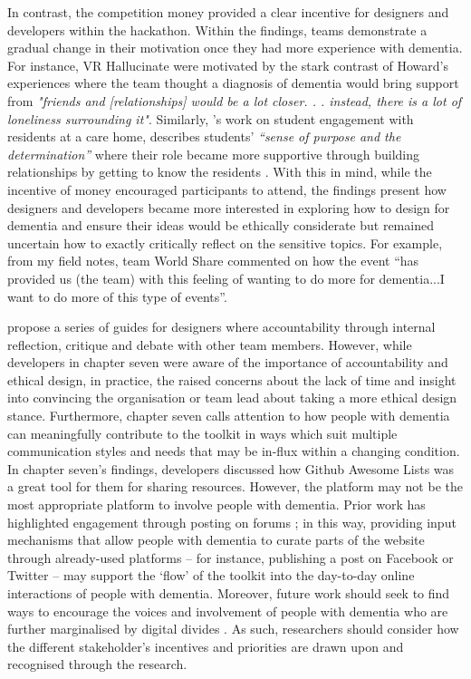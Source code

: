 In contrast, the competition money provided a clear incentive for designers and developers within the hackathon. Within the findings, teams demonstrate a gradual change in their motivation once they had more experience with dementia. For instance, VR Hallucinate were motivated by the stark contrast of Howard’s experiences where the team thought a diagnosis of dementia would bring support from \textit{"friends and [relationships] would be a lot closer. . . instead, there is a lot of loneliness surrounding it"}. Similarly, \citeauthor{foley_student_2020}'s work on student engagement with residents at a care home, describes students' \textit{``sense of purpose and the determination''} where their role became more supportive through building relationships by getting to know the residents \citep{foley_student_2020}. With this in mind, while the incentive of money encouraged participants to attend, the findings present how designers and developers became more interested in exploring how to design for dementia and ensure their ideas would be ethically considerate but remained uncertain how to exactly critically reflect on the sensitive topics. For example, from my field notes, team World Share commented on how the event ``has provided us (the team) with this feeling of wanting to do more for dementia...I want to do more of this type of events''.

\cite{frauenberger2015pursuit} propose a series of guides for designers where accountability through internal reflection, critique and debate with other team members. However, while developers in chapter seven were aware of the importance of accountability and ethical design, in practice, the raised concerns about the lack of time and insight into convincing the organisation or team lead about taking a more ethical design stance. Furthermore, chapter seven calls attention to how people with dementia can meaningfully contribute to the toolkit in ways which suit multiple communication styles and needs that may be in-flux within a changing condition. In chapter seven's findings, developers discussed how Github Awesome Lists was a great tool for them for sharing resources. However, the platform may not be the most appropriate platform to involve people with dementia. Prior work has highlighted engagement through posting on forums \citep{johnson2020roles}; in this way, providing input mechanisms that allow people with dementia to curate parts of the website through already-used platforms – for instance, publishing a post on Facebook or Twitter \citep{talbot_how_2020} – may support the ‘flow’ of the toolkit into the day-to-day online interactions of people with dementia. Moreover, future work should seek to find ways to encourage the voices and involvement of people with dementia who are further marginalised by digital divides \citep{harrington_forgotten_2020}. As such, researchers should consider how the different stakeholder's incentives and priorities are drawn upon and recognised through the research.

